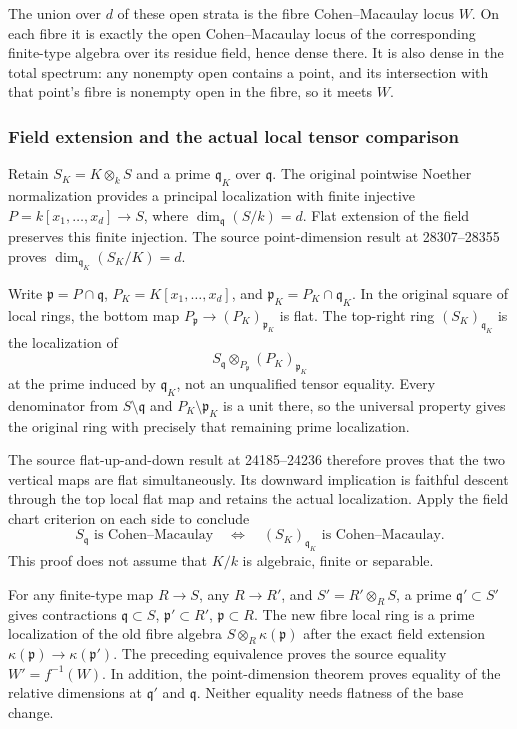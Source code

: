 The union over \(d\) of these open strata is the fibre Cohen--Macaulay locus \(W\). On each fibre it is exactly the open Cohen--Macaulay locus of the corresponding finite-type algebra over its residue field, hence dense there. It is also dense in the total spectrum: any nonempty open contains a point, and its intersection with that point's fibre is nonempty open in the fibre, so it meets \(W\).

\subsubsection{Field extension and the actual local tensor comparison}\label{field-extension-and-the-actual-local-tensor-comparison}

Retain \(S_K=K\otimes_k S\) and a prime \(\mathfrak q_K\) over \(\mathfrak q\). The original pointwise Noether normalization provides a principal localization with finite injective \(P=k[x_1,\ldots,x_d]\to S\), where \(\dim_{\mathfrak q}(S/k)=d\). Flat extension of the field preserves this finite injection. The source point-dimension result at 28307--28355 proves \(\dim_{\mathfrak q_K}(S_K/K)=d\).

Write \(\mathfrak p=P\cap\mathfrak q\), \(P_K=K[x_1,\ldots,x_d]\), and \(\mathfrak p_K=P_K\cap\mathfrak q_K\). In the original square of local rings, the bottom map \(P_{\mathfrak p}\to(P_K)_{\mathfrak p_K}\) is flat. The top-right ring \((S_K)_{\mathfrak q_K}\) is the localization of \[
S_{\mathfrak q}\otimes_{P_{\mathfrak p}}(P_K)_{\mathfrak p_K}
\] at the prime induced by \(\mathfrak q_K\), not an unqualified tensor equality. Every denominator from \(S\setminus\mathfrak q\) and \(P_K\setminus\mathfrak p_K\) is a unit there, so the universal property gives the original ring with precisely that remaining prime localization.

The source flat-up-and-down result at 24185--24236 therefore proves that the two vertical maps are flat simultaneously. Its downward implication is faithful descent through the top local flat map and retains the actual localization. Apply the field chart criterion on each side to conclude \[
S_{\mathfrak q}\text{ is Cohen–Macaulay}
\quad\Longleftrightarrow\quad
(S_K)_{\mathfrak q_K}\text{ is Cohen–Macaulay}.
\] This proof does not assume that \(K/k\) is algebraic, finite or separable.

For any finite-type map \(R\to S\), any \(R\to R'\), and \(S'=R'\otimes_R S\), a prime \(\mathfrak q'\subset S'\) gives contractions \(\mathfrak q\subset S\), \(\mathfrak p'\subset R'\), \(\mathfrak p\subset R\). The new fibre local ring is a prime localization of the old fibre algebra \(S\otimes_R\kappa(\mathfrak p)\) after the exact field extension \(\kappa(\mathfrak p)\to\kappa(\mathfrak p')\). The preceding equivalence proves the source equality \(W'=f^{-1}(W)\). In addition, the point-dimension theorem proves equality of the relative dimensions at \(\mathfrak q'\) and \(\mathfrak q\). Neither equality needs flatness of the base change.

